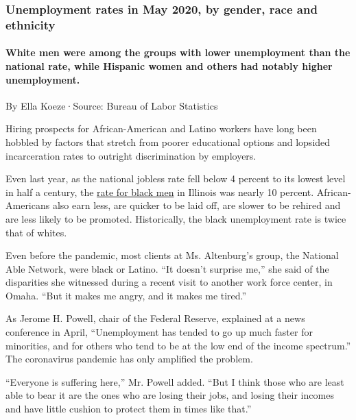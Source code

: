 \hypertarget{unemployment-rates-in-may-2020-by-gender-race-and-ethnicity}{%
\subsubsection{Unemployment rates in May 2020, by gender, race and
ethnicity}\label{unemployment-rates-in-may-2020-by-gender-race-and-ethnicity}}

\hypertarget{white-men-were-among-the-groups-with-lower-unemployment-than-the-national-rate-while-hispanic-women-and-others-had-notably-higher-unemployment}{%
\paragraph{White men were among the groups with lower unemployment than
the national rate, while Hispanic women and others had notably higher
unemployment.}\label{white-men-were-among-the-groups-with-lower-unemployment-than-the-national-rate-while-hispanic-women-and-others-had-notably-higher-unemployment}}

By Ella Koeze·Source: Bureau of Labor Statistics

Hiring prospects for African-American and Latino workers have long been
hobbled by factors that stretch from poorer educational options and
lopsided incarceration rates to outright discrimination by employers.

Even last year, as the national jobless rate fell below 4 percent to its
lowest level in half a century, the
\href{https://www.bls.gov/lau/ptable14full2019.htm}{rate for black men}
in Illinois was nearly 10 percent. African-Americans also earn less, are
quicker to be laid off, are slower to be rehired and are less likely to
be promoted. Historically, the black unemployment rate is twice that of
whites.

Even before the pandemic, most clients at Ms. Altenburg's group, the
National Able Network, were black or Latino. ``It doesn't surprise me,''
she said of the disparities she witnessed during a recent visit to
another work force center, in Omaha. ``But it makes me angry, and it
makes me tired.''

As Jerome H. Powell, chair of the Federal Reserve, explained at a news
conference in April, ``Unemployment has tended to go up much faster for
minorities, and for others who tend to be at the low end of the income
spectrum.'' The coronavirus pandemic has only amplified the problem.

``Everyone is suffering here,'' Mr. Powell added. ``But I think those
who are least able to bear it are the ones who are losing their jobs,
and losing their incomes and have little cushion to protect them in
times like that.''

